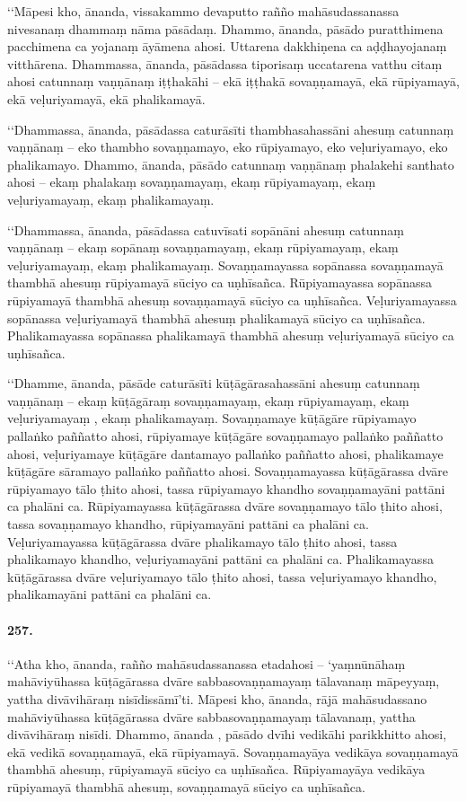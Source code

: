‘‘Māpesi kho, ānanda, vissakammo devaputto rañño mahāsudassanassa nivesanaṃ dhammaṃ nāma pāsādaṃ. Dhammo, ānanda, pāsādo puratthimena pacchimena ca yojanaṃ āyāmena ahosi. Uttarena dakkhiṇena ca aḍḍhayojanaṃ vitthārena. Dhammassa, ānanda, pāsādassa tiporisaṃ uccatarena vatthu citaṃ ahosi catunnaṃ vaṇṇānaṃ iṭṭhakāhi – ekā iṭṭhakā sovaṇṇamayā, ekā rūpiyamayā, ekā veḷuriyamayā, ekā phalikamayā.

‘‘Dhammassa, ānanda, pāsādassa caturāsīti thambhasahassāni ahesuṃ catunnaṃ vaṇṇānaṃ – eko thambho sovaṇṇamayo, eko rūpiyamayo, eko veḷuriyamayo, eko phalikamayo. Dhammo, ānanda, pāsādo catunnaṃ vaṇṇānaṃ phalakehi santhato ahosi – ekaṃ phalakaṃ sovaṇṇamayaṃ, ekaṃ rūpiyamayaṃ, ekaṃ veḷuriyamayaṃ, ekaṃ phalikamayaṃ.

‘‘Dhammassa, ānanda, pāsādassa catuvīsati sopānāni ahesuṃ catunnaṃ vaṇṇānaṃ – ekaṃ sopānaṃ sovaṇṇamayaṃ, ekaṃ rūpiyamayaṃ, ekaṃ veḷuriyamayaṃ, ekaṃ phalikamayaṃ. Sovaṇṇamayassa sopānassa sovaṇṇamayā thambhā ahesuṃ rūpiyamayā sūciyo ca uṇhīsañca. Rūpiyamayassa sopānassa rūpiyamayā thambhā ahesuṃ sovaṇṇamayā sūciyo ca uṇhīsañca. Veḷuriyamayassa sopānassa veḷuriyamayā thambhā ahesuṃ phalikamayā sūciyo ca uṇhīsañca. Phalikamayassa sopānassa phalikamayā thambhā ahesuṃ veḷuriyamayā sūciyo ca uṇhīsañca.

‘‘Dhamme, ānanda, pāsāde caturāsīti kūṭāgārasahassāni ahesuṃ catunnaṃ vaṇṇānaṃ – ekaṃ kūṭāgāraṃ sovaṇṇamayaṃ, ekaṃ rūpiyamayaṃ, ekaṃ veḷuriyamayaṃ , ekaṃ phalikamayaṃ. Sovaṇṇamaye kūṭāgāre rūpiyamayo pallaṅko paññatto ahosi, rūpiyamaye kūṭāgāre sovaṇṇamayo pallaṅko paññatto ahosi, veḷuriyamaye kūṭāgāre dantamayo pallaṅko paññatto ahosi, phalikamaye kūṭāgāre sāramayo pallaṅko paññatto ahosi. Sovaṇṇamayassa kūṭāgārassa dvāre rūpiyamayo tālo ṭhito ahosi, tassa rūpiyamayo khandho sovaṇṇamayāni pattāni ca phalāni ca. Rūpiyamayassa kūṭāgārassa dvāre sovaṇṇamayo tālo ṭhito ahosi, tassa sovaṇṇamayo khandho, rūpiyamayāni pattāni ca phalāni ca. Veḷuriyamayassa kūṭāgārassa dvāre phalikamayo tālo ṭhito ahosi, tassa phalikamayo khandho, veḷuriyamayāni pattāni ca phalāni ca. Phalikamayassa kūṭāgārassa dvāre veḷuriyamayo tālo ṭhito ahosi, tassa veḷuriyamayo khandho, phalikamayāni pattāni ca phalāni ca.

\paragraph{257.} ‘‘Atha kho, ānanda, rañño mahāsudassanassa etadahosi – ‘yaṃnūnāhaṃ mahāviyūhassa kūṭāgārassa dvāre sabbasovaṇṇamayaṃ tālavanaṃ māpeyyaṃ, yattha divāvihāraṃ nisīdissāmī’ti. Māpesi kho, ānanda, rājā mahāsudassano mahāviyūhassa kūṭāgārassa dvāre sabbasovaṇṇamayaṃ tālavanaṃ, yattha divāvihāraṃ nisīdi. Dhammo, ānanda , pāsādo dvīhi vedikāhi parikkhitto ahosi, ekā vedikā sovaṇṇamayā, ekā rūpiyamayā. Sovaṇṇamayāya vedikāya sovaṇṇamayā thambhā ahesuṃ, rūpiyamayā sūciyo ca uṇhīsañca. Rūpiyamayāya vedikāya rūpiyamayā thambhā ahesuṃ, sovaṇṇamayā sūciyo ca uṇhīsañca.

